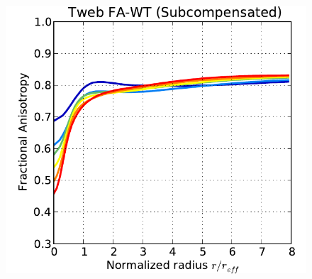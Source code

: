 \documentclass[a4,useAMS,usenatbib,usegraphicx]{latex/mn2e}
\begin{document}
\begin{figure}
  \includegraphics[trim = 1mm 0mm 5mm 0mm, clip, keepaspectratio=true,
  width=0.24\textheight]{./figures/voids_FA_TwebFAG0.pdf}
  

\end{figure}
\end{document}
